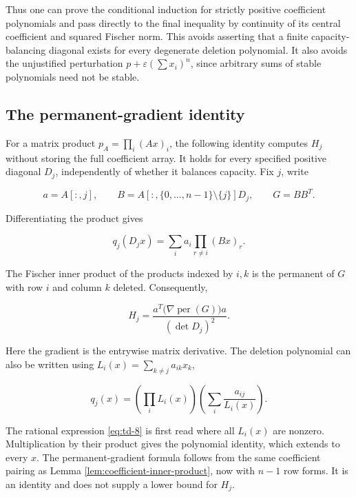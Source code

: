 \documentclass[11pt,a4paper]{article}
\theoremstyle{definition}
\theoremstyle{remark}
\begin{document}
Thus one can prove the conditional induction for strictly positive
coefficient polynomials and pass directly to the final inequality by
continuity of its central coefficient and squared Fischer norm. This avoids
asserting that a finite capacity-balancing diagonal exists for every
degenerate deletion polynomial. It also avoids the unjustified
perturbation \(p+\varepsilon(\sum x_i)^n\), since arbitrary sums of
stable polynomials need not be stable.

\subsection{The permanent-gradient
identity}\label{deletion-the-permanent-gradient-identity}

For a matrix product \(p_A=\prod_i(Ax)_i\), the following identity
computes \(H_j\) without storing the full coefficient array. It holds
for every specified positive diagonal \(D_j\), independently of whether
it balances capacity. Fix \(j\), write

\[
a=A[:,j],\qquad B=A[:,\{0,\ldots,n-1\}\setminus\{j\}]D_j,
\qquad G=BB^T.
\]

Differentiating the product gives

\[
q_j(D_jx)=\sum_i a_i\prod_{r\ne i}(Bx)_r.
\]

The Fischer inner product of the products indexed by \(i,k\) is the
permanent of \(G\) with row \(i\) and column \(k\) deleted.
Consequently,

\begin{equation}\label{eq:td-7}
H_j=\frac{a^T\bigl(\nabla\operatorname{per}(G)\bigr)a}{(\det D_j)^2}.
\end{equation}

Here the gradient is the entrywise matrix derivative. The deletion polynomial can also be written using
\(L_i(x)=\sum_{k\ne j}a_{ik}x_k\),

\begin{equation}\label{eq:td-8}
q_j(x)=\left(\prod_iL_i(x)\right)\left(\sum_i\frac{a_{ij}}{L_i(x)}\right).
\end{equation}

The rational expression \eqref{eq:td-8} is first read where all \(L_i(x)\) are
nonzero. Multiplication by their product gives the polynomial identity,
which extends to every \(x\). The permanent-gradient formula follows
from the same coefficient pairing as Lemma
\ref{lem:coefficient-inner-product}, now with \(n-1\) row forms. It is
an identity and does not supply a lower bound for \(H_j\).
\end{document}
